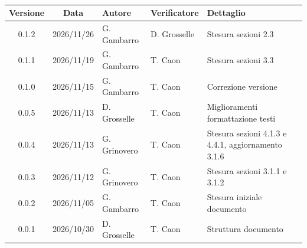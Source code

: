 \\[0.5cm]

\renewcommand{\arraystretch}{1.3}
\noindent\begin{tabularx}{\textwidth}{|c|c|>{\raggedright\arraybackslash}p{2.8cm}|>{\raggedright\arraybackslash}p{2.8cm}|X|}
    \hline
    \textbf{Versione} & \textbf{Data} & \textbf{Autore} & \textbf{Verificatore} & \textbf{Dettaglio} \\
    \hline
    0.1.2 & 2026/11/26 & G. Gambarro & D. Grosselle & Stesura sezioni 2.3\\
    \hline
    0.1.1 & 2026/11/19 & G. Gambarro & T. Caon & Stesura sezioni 3.3\\
    \hline
    0.1.0 & 2026/11/15 & G. Gambarro & T. Caon & Correzione versione \\
    \hline
    0.0.5 & 2026/11/13 & D. Grosselle & T. Caon & Miglioramenti formattazione testi \\
    \hline
    0.0.4 & 2026/11/13 & G. Grinovero & T. Caon & Stesura sezioni 4.1.3 e 4.4.1, aggiornamento 3.1.6 \\
    \hline
    0.0.3 & 2026/11/12 & G. Grinovero & T. Caon & Stesura sezioni 3.1.1 e 3.1.2 \\
    \hline
    0.0.2 & 2026/11/05 & G. Gambarro & T. Caon & Stesura iniziale documento \\
    \hline
    0.0.1 & 2026/10/30 & D. Grosselle & T. Caon & Struttura documento \\
    \hline
\end{tabularx}
\newpage
